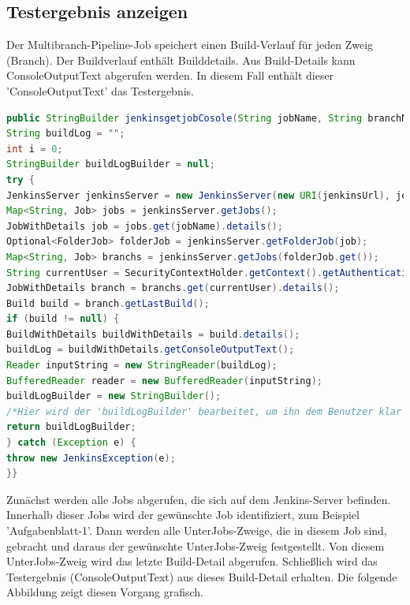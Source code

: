 \documentclass[a4paper,12pt,oneside]{book}
\begin{document}
\subsection{Testergebnis anzeigen}
 Der Multibranch-Pipeline-Job speichert einen Build-Verlauf für jeden Zweig (Branch). Der Buildverlauf enthält Builddetails. Aus Build-Details kann ConsoleOutputText abgerufen werden. In diesem Fall enthält dieser 'ConsoleOutputText' das Testergebnis.
 \begin{lstlisting}[language=JAVA,caption=Testergebnis Anfrage ]
public StringBuilder jenkinsgetjobCosole(String jobName, String branchName ) throws JenkinsException {
String buildLog = "";
int i = 0;
StringBuilder buildLogBuilder = null;
try {
JenkinsServer jenkinsServer = new JenkinsServer(new URI(jenkinsUrl), jenkinsUser, jenkinsPassword);
Map<String, Job> jobs = jenkinsServer.getJobs();
JobWithDetails job = jobs.get(jobName).details();
Optional<FolderJob> folderJob = jenkinsServer.getFolderJob(job);
Map<String, Job> branchs = jenkinsServer.getJobs(folderJob.get());
String currentUser = SecurityContextHolder.getContext().getAuthentication().getName();
JobWithDetails branch = branchs.get(currentUser).details();
Build build = branch.getLastBuild();
if (build != null) {
BuildWithDetails buildWithDetails = build.details();
buildLog = buildWithDetails.getConsoleOutputText();
Reader inputString = new StringReader(buildLog);
BufferedReader reader = new BufferedReader(inputString);
buildLogBuilder = new StringBuilder();  
/*Hier wird der 'buildLogBuilder' bearbeitet, um ihn dem Benutzer klar zu zeigen.*/
return buildLogBuilder;
} catch (Exception e) {
throw new JenkinsException(e);
}}
 \end{lstlisting}
 \newpage
 Zunächst werden alle Jobs abgerufen, die sich auf dem Jenkins-Server befinden. Innerhalb dieser Jobs wird der gewünschte Job identifiziert, zum Beispiel 'Aufgabenblatt-1'. Dann werden alle UnterJobs-Zweige, die in diesem Job sind, gebracht und daraus der gewünschte UnterJobs-Zweig festgestellt. Von diesem  UnterJobs-Zweig wird das letzte Build-Detail abgerufen. Schließlich wird das Testergebnis (ConsoleOutputText) aus dieses Build-Detail erhalten. Die folgende Abbildung zeigt diesen Vorgang grafisch.
\end{document}

